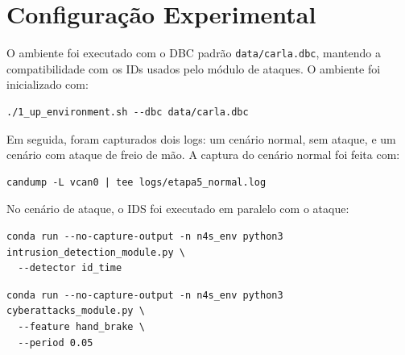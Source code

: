 \documentclass[12pt,a4paper]{article}
\begin{document}
\section{Configura\c{c}\~ao Experimental}

O ambiente foi executado com o DBC padr\~ao \texttt{data/carla.dbc}, mantendo a
compatibilidade com os IDs usados pelo m\'odulo de ataques. O ambiente foi inicializado
com:

\begin{center}
\begin{minipage}{0.92\linewidth}
\begin{Verbatim}[fontsize=\footnotesize,breaklines=true,breakanywhere=true]
./1_up_environment.sh --dbc data/carla.dbc
\end{Verbatim}
\end{minipage}
\end{center}

Em seguida, foram capturados dois logs: um cen\'ario normal, sem ataque, e um cen\'ario
com ataque de freio de m\~ao. A captura do cen\'ario normal foi feita com:

\begin{center}
\begin{minipage}{0.92\linewidth}
\begin{Verbatim}[fontsize=\footnotesize,breaklines=true,breakanywhere=true]
candump -L vcan0 | tee logs/etapa5_normal.log
\end{Verbatim}
\end{minipage}
\end{center}

No cen\'ario de ataque, o IDS foi executado em paralelo com o ataque:

\begin{center}
\begin{minipage}{0.92\linewidth}
\begin{Verbatim}[fontsize=\footnotesize,breaklines=true,breakanywhere=true]
conda run --no-capture-output -n n4s_env python3 intrusion_detection_module.py \
  --detector id_time
\end{Verbatim}
\end{minipage}
\end{center}

\begin{center}
\begin{minipage}{0.92\linewidth}
\begin{Verbatim}[fontsize=\footnotesize,breaklines=true,breakanywhere=true]
conda run --no-capture-output -n n4s_env python3 cyberattacks_module.py \
  --feature hand_brake \
  --period 0.05
\end{Verbatim}
\end{minipage}
\end{center}
\end{document}
